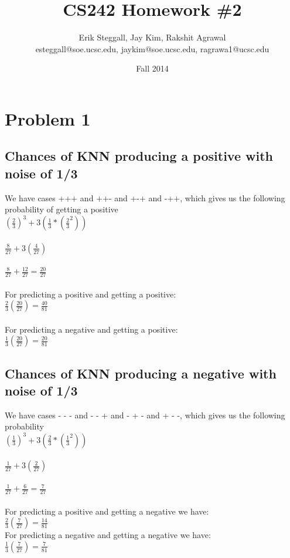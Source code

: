 \documentclass{article}
\title{CS242 Homework \#2}
\author{Erik Steggall, Jay Kim, Rakshit Agrawal \\ esteggall@soe.ucsc.edu, jaykim@soe.ucsc.edu, ragrawa1@ucsc.edu}
\date{Fall 2014}
\begin{document}
 \maketitle \pagestyle{empty}
\section*{Problem 1}

\subsection*{Chances of KNN producing a positive with noise of 1/3}
We have cases +++ and ++- and +-+ and -++, which gives us the following probability of getting a positive\\
$(\frac{2}{3})^3 + 3 (\frac{1}{3} * (\frac{2}{3}^2))$\\ \\
$\frac{8}{27} + 3(\frac{4}{27})$\\\\  
$\frac{8}{27} + \frac{12}{27} = \frac{20}{27}$\\\\  

For predicting a positive and getting a positive:\\
$\frac{2}{3}(\frac{20}{27}) = \frac{40}{81}$\\\\
For predicting a negative and getting a positive:\\
$\frac{1}{3}(\frac{20}{27}) = \frac{20}{81}$\\

\subsection*{Chances of KNN producing a negative with noise of 1/3}
We have cases - - - and - - + and - + - and + - -, which gives us the following probability\\
$(\frac{1}{3})^3 + 3 (\frac{2}{3} * (\frac{1}{3}^2))$\\\\
$\frac{1}{27} + 3(\frac{2}{27})$\\\\
$\frac{1}{27} + \frac{6}{27} = \frac{7}{27}$\\\\

For predicting a positive and getting a negative we have:\\
$\frac{2}{3}(\frac{7}{27}) = \frac{14}{81}$\\
For predicting a negative and getting a negative we have:\\
$\frac{1}{3}(\frac{7}{27}) = \frac{7}{81}$\\
\end{document}
